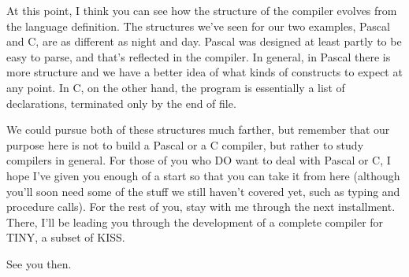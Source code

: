 At  this  point, I think you can see how the  structure  of  the compiler evolves from the language  definition. The structures we've seen for our  two  examples, Pascal and C, are as different as night and day. Pascal was designed at least partly to be easy to parse, and that's  reflected  in the compiler. In general, in Pascal there is more structure and we have a better idea  of what kinds of constructs to expect at any point. In  C, on the other hand, the  program  is  essentially  a  list   of  declarations, terminated only by the end of file.

We  could  pursue  both  of  these structures much  farther, but remember that our purpose here is  not  to  build a Pascal or a C compiler, but rather to study compilers in general. For those of you  who DO want to deal with Pascal or C, I hope I've given  you enough of a start so that you can  take  it  from  here (although you'll soon need some of the stuff we still haven't  covered yet, such as typing and procedure calls). For the rest of you, stay with me through the next installment. There, I'll be leading you through the development of a complete compiler for TINY, a subset of KISS.

See you then.
